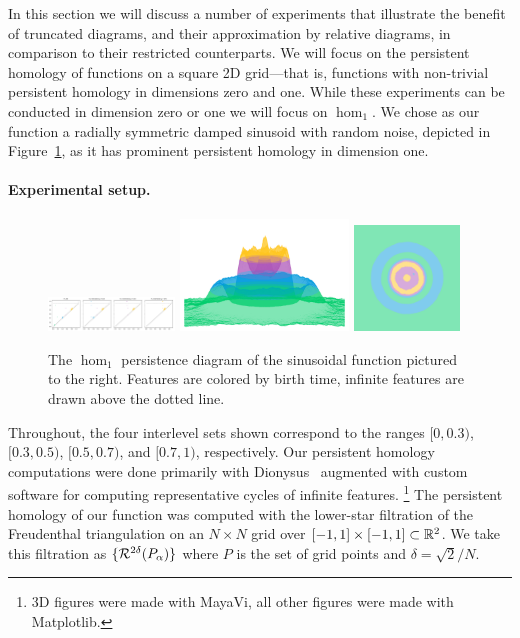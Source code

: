
In this section we will discuss a number of experiments that illustrate the benefit of truncated diagrams, and their approximation by relative diagrams, in comparison to their restricted counterparts.
We will focus on the persistent homology of functions on a square 2D grid---that is, functions with non-trivial persistent homology in dimensions zero and one.
While these experiments can be conducted in dimension zero or one we will focus on $\hom_1$.
We chose as our function a radially symmetric damped sinusoid with random noise, depicted in Figure~\ref{fig:ripple1}, as it has prominent persistent homology in dimension one.

\paragraph*{Experimental setup.}

\begin{figure}[htbp]
  \centering
  \includegraphics[trim=0 0 790 0, clip, width=0.3\textwidth]{figures/matching-full-dgm.pdf}
  \includegraphics[trim=-350 -800 -700 -300, clip, width=0.4\textwidth]{figures/matching-full-surf_side-lowres.png}
  \includegraphics[trim=0 -800 0 0, width=0.25\textwidth]{figures/matching-full-surf_top-lowres.png}
  \caption{The $\hom_1$ persistence diagram of the sinusoidal function pictured to the right.
  Features are colored by birth time, infinite features are drawn above the dotted line.}\label{fig:ripple1}
\end{figure}

Throughout, the four interlevel sets shown correspond to the ranges $[0, 0.3)$, $[0.3, 0.5)$, $[0.5, 0.7)$, and $[0.7, 1)$, respectively.
Our persistent homology computations were done primarily with Dionysus~\cite{morozov12dionysus} augmented with custom software for computing representative cycles of infinite features.
\footnote{3D figures were made with MayaVi, all other figures were made with Matplotlib.}
The persistent homology of our function was computed with the lower-star filtration of the Freudenthal triangulation on an $N\times N$ grid over $[-1,1]\times[-1,1]\subset\mathbb{R}^2$.
We take this filtration as $\{\mathcal{R}^{2\delta}(P_\alpha)\}$ where $P$ is the set of grid points and $\delta = \sqrt{2} / N$.

